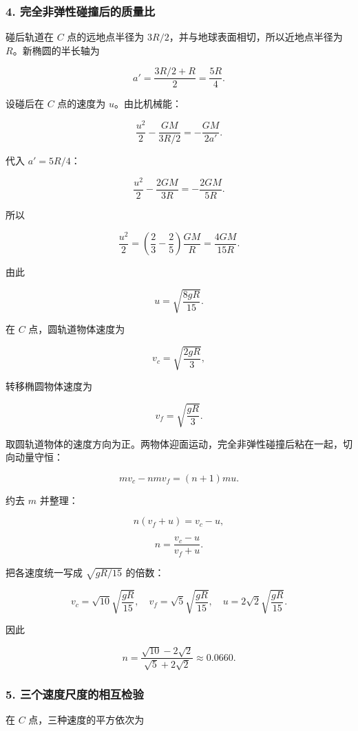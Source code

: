 \documentclass[12pt,a4paper,UTF8]{ctexart}
\begin{document}
\subsubsection{4.
完全非弹性碰撞后的质量比}\label{ux5b8cux5168ux975eux5f39ux6027ux78b0ux649eux540eux7684ux8d28ux91cfux6bd4}

碰后轨道在 \(C\) 点的远地点半径为
\(3R/2\)，并与地球表面相切，所以近地点半径为 \(R\)。新椭圆的半长轴为

\[
a'=\frac{3R/2+R}{2}=\frac{5R}{4}.
\]

设碰后在 \(C\) 点的速度为 \(u\)。由比机械能：

\[
\frac{u^2}{2}-\frac{GM}{3R/2}
=-\frac{GM}{2a'}.
\]

代入 \(a'=5R/4\)：

\[
\frac{u^2}{2}-\frac{2GM}{3R}
=-\frac{2GM}{5R}.
\]

所以

\[
\frac{u^2}{2}
=\left(\frac23-\frac25\right)\frac{GM}{R}
=\frac{4GM}{15R}.
\]

由此

\[
\boxed{u=\sqrt{\frac{8gR}{15}}}.
\]

在 \(C\) 点，圆轨道物体速度为

\[
v_c=\sqrt{\frac{2gR}{3}},
\]

转移椭圆物体速度为

\[
v_f=\sqrt{\frac{gR}{3}}.
\]

取圆轨道物体的速度方向为正。两物体迎面运动，完全非弹性碰撞后粘在一起，切向动量守恒：

\[
mv_c-nm v_f=(n+1)m u.
\]

约去 \(m\) 并整理：

\[
n(v_f+u)=v_c-u,
\]

\[
n=\frac{v_c-u}{v_f+u}.
\]

把各速度统一写成 \(\sqrt{gR/15}\) 的倍数：

\[
v_c=\sqrt{10}\sqrt{\frac{gR}{15}},
\quad
v_f=\sqrt5\sqrt{\frac{gR}{15}},
\quad
u=2\sqrt2\sqrt{\frac{gR}{15}}.
\]

因此

\[
\boxed{
n=\frac{\sqrt{10}-2\sqrt2}{\sqrt5+2\sqrt2}
\approx0.0660
}.
\]

\subsubsection{5.
三个速度尺度的相互检验}\label{ux4e09ux4e2aux901fux5ea6ux5c3aux5ea6ux7684ux76f8ux4e92ux68c0ux9a8c}

在 \(C\) 点，三种速度的平方依次为
\end{document}
